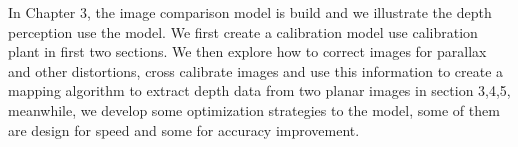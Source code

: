 In Chapter 3, the image comparison model is build and we illustrate the depth perception use the model. We first create a calibration model use calibration plant in first two sections. We then explore how to correct images for parallax and other distortions, cross calibrate images and use this information to create a mapping algorithm to extract depth data from two planar images in section 3,4,5, meanwhile, we develop some optimization strategies to the model, some of them are design for speed and some for accuracy improvement.

